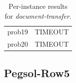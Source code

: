 \begin{table}[H]
{\begin{tabular}{lrrr rr rr rr rrrrr}
            prob19           & \multicolumn{14}{c}{TIMEOUT}                                                                                                                                 \\
            prob20           & \multicolumn{14}{c}{TIMEOUT}                                                                                                                                 \\
            \bottomrule
        \end{tabular}%
    }
    \caption{Per-instance results for \textit{document-transfer}.}
    \label{tab:appendix_doctransfer}
\end{table}

\subsection{Pegsol-Row5}
\label{app:results_pegsolrow5}

